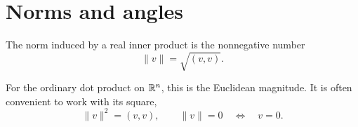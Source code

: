 \section{Norms and angles}
\label{sec:linear-algebra-i:inner-product-norms-and-angles}

\begin{definition}
  The norm induced by a real inner product is the nonnegative number
  \[
    \lVert v\rVert=\sqrt{(v,v)}.
  \]
\end{definition}

For the ordinary dot product on \(\mathbb{R}^n\), this is the Euclidean
magnitude. It is often convenient to work with its square,
\[
  \lVert v\rVert^2=(v,v),\qquad
  \lVert v\rVert=0\quad\Longleftrightarrow\quad v=0.
\]


